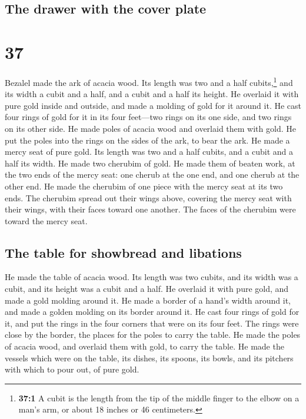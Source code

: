 \hypertarget{the-drawer-with-the-cover-plate}{%
\subsection{The drawer with the cover
plate}\label{the-drawer-with-the-cover-plate}}

\hypertarget{section-36}{%
\section{37}\label{section-36}}

 Bezalel made the ark of acacia wood. Its length was two
and a half cubits,\footnote{\textbf{37:1} A cubit is the length from the
  tip of the middle finger to the elbow on a man's arm, or about 18
  inches or 46 centimeters.} and its width a cubit and a half, and a
cubit and a half its height.  He overlaid it with pure
gold inside and outside, and made a molding of gold for it around it.
 He cast four rings of gold for it in its four feet---two
rings on its one side, and two rings on its other side. 
He made poles of acacia wood and overlaid them with gold. 
He put the poles into the rings on the sides of the ark, to bear the
ark.  He made a mercy seat of pure gold. Its length was
two and a half cubits, and a cubit and a half its width. 
He made two cherubim of gold. He made them of beaten work, at the two
ends of the mercy seat:  one cherub at the one end, and
one cherub at the other end. He made the cherubim of one piece with the
mercy seat at its two ends.  The cherubim spread out their
wings above, covering the mercy seat with their wings, with their faces
toward one another. The faces of the cherubim were toward the mercy
seat.

\hypertarget{the-table-for-showbread-and-libations}{%
\subsection{The table for showbread and
libations}\label{the-table-for-showbread-and-libations}}

 He made the table of acacia wood. Its length was two
cubits, and its width was a cubit, and its height was a cubit and a
half.  He overlaid it with pure gold, and made a gold
molding around it.  He made a border of a hand's width
around it, and made a golden molding on its border around it.
 He cast four rings of gold for it, and put the rings in
the four corners that were on its four feet.  The rings
were close by the border, the places for the poles to carry the table.
 He made the poles of acacia wood, and overlaid them with
gold, to carry the table.  He made the vessels which were
on the table, its dishes, its spoons, its bowls, and its pitchers with
which to pour out, of pure gold.

